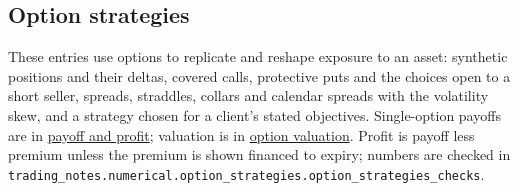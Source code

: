 \subsection{Option strategies}

These entries use options to replicate and reshape exposure to an asset: synthetic positions and their deltas, covered calls, protective puts and the choices open to a short seller, spreads, straddles, collars and calendar spreads with the volatility skew, and a strategy chosen for a client's stated objectives. Single-option payoffs are in \hyperref[meth:option-payoff-profit]{payoff and profit}; valuation is in \hyperref[def:option-value-drivers]{option valuation}. Profit is payoff less premium unless the premium is shown financed to expiry; numbers are checked in \nolinkurl{trading_notes.numerical.option_strategies.option_strategies_checks}.

